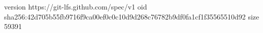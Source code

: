 version https://git-lfs.github.com/spec/v1
oid sha256:42d705b55fb9716f9ca00ef0c0c10d9d268c76782b9df0fa1cf1f35565510d92
size 59391
